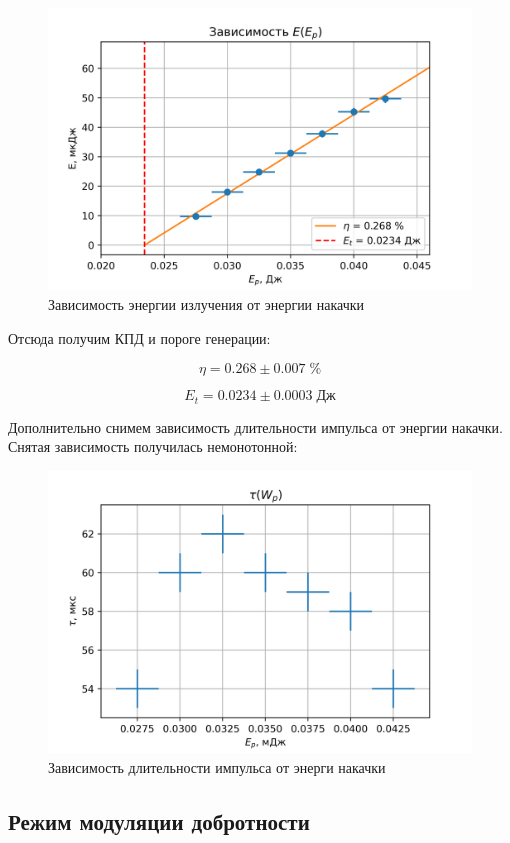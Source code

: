 \documentclass[a4paper]{article}
\begin{document}
\begin{figure}[h]
\centering
\includegraphics[width=0.65\linewidth]{linear_W1.png}
\caption{Зависимость энергии излучения от энергии накачки}
\label{fig:graph}
\end{figure}

Отсюда получим КПД и пороге генерации: 

\begin{equation*}
	\eta = 0.268 \pm 0.007 \; \%
\end{equation*}

\begin{equation*}
	E_t = 0.0234 \pm 0.0003 \; \text{Дж}
\end{equation*}

Дополнительно снимем зависимость длительности импульса от энергии накачки. Снятая зависимость получилась немонотонной:

\begin{figure}[h]
\centering
\includegraphics[width=0.65\linewidth]{linear_width1.png}
\caption{Зависимость длительности импульса от энерги накачки}
\label{fig:graph}
\end{figure}

\newpage

\subsection{Режим модуляции добротности}
\end{document}
